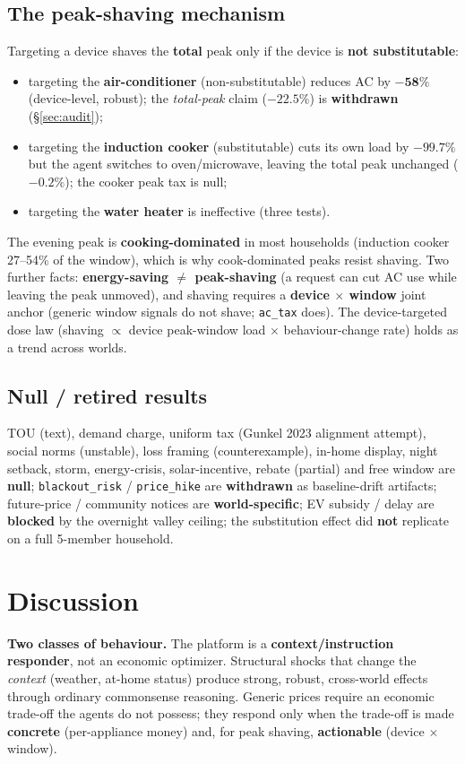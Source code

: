 \documentclass[11pt]{article}
\begin{document}
\subsection{The peak-shaving mechanism}
Targeting a device shaves the \textbf{total} peak only if the device is \textbf{not substitutable}:
\begin{itemize}
\item targeting the \textbf{air-conditioner} (non-substitutable) reduces AC by $\mathbf{-58\%}$
(device-level, robust); the \emph{total-peak} claim ($-22.5\%$) is \textbf{withdrawn} (\S\ref{sec:audit});
\item targeting the \textbf{induction cooker} (substitutable) cuts its own load by $-99.7\%$ but the agent
switches to oven/microwave, leaving the total peak unchanged ($-0.2\%$); the cooker peak tax is null;
\item targeting the \textbf{water heater} is ineffective (three tests).
\end{itemize}
The evening peak is \textbf{cooking-dominated} in most households (induction cooker 27--54\% of the
window), which is why cook-dominated peaks resist shaving. Two further facts: \textbf{energy-saving
$\neq$ peak-shaving} (a request can cut AC use while leaving the peak unmoved), and shaving requires a
\textbf{device $\times$ window} joint anchor (generic window signals do not shave; \texttt{ac\_tax} does).
The device-targeted dose law (shaving $\propto$ device peak-window load $\times$ behaviour-change rate)
holds as a trend across worlds.

\subsection{Null / retired results}
TOU (text), demand charge, uniform tax (Gunkel 2023 alignment attempt), social norms (unstable), loss
framing (counterexample), in-home display, night setback, storm, energy-crisis, solar-incentive, rebate
(partial) and free window are \textbf{null}; \texttt{blackout\_risk} / \texttt{price\_hike} are
\textbf{withdrawn} as baseline-drift artifacts; future-price / community notices are \textbf{world-specific};
EV subsidy / delay are \textbf{blocked} by the overnight valley ceiling; the substitution effect did
\textbf{not} replicate on a full 5-member household.

\section{Discussion}
\textbf{Two classes of behaviour.} The platform is a \textbf{context/instruction responder}, not an
economic optimizer. Structural shocks that change the \emph{context} (weather, at-home status) produce
strong, robust, cross-world effects through ordinary commonsense reasoning. Generic prices require an
economic trade-off the agents do not possess; they respond only when the trade-off is made
\textbf{concrete} (per-appliance money) and, for peak shaving, \textbf{actionable} (device $\times$ window).
\end{document}
